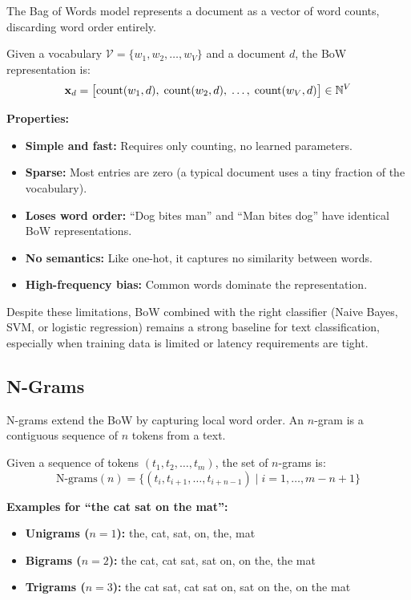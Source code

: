The Bag of Words model represents a document as a vector of word counts, discarding word
order entirely.

Given a vocabulary $\mathcal{V} = \{w_1, w_2, \ldots, w_V\}$ and a document $d$, the BoW
representation is:
\begin{equation}
    \mathbf{x}_d = \bigl[\text{count}(w_1, d), \; \text{count}(w_2, d), \; \ldots, \; \text{count}(w_V, d)\bigr] \in \mathbb{N}^V
\end{equation}

\textbf{Properties:}
\begin{itemize}
    \item \textbf{Simple and fast:} Requires only counting, no learned parameters.
    \item \textbf{Sparse:} Most entries are zero (a typical document uses a tiny fraction
    of the vocabulary).
    \item \textbf{Loses word order:} ``Dog bites man'' and ``Man bites dog'' have identical
    BoW representations.
    \item \textbf{No semantics:} Like one-hot, it captures no similarity between words.
    \item \textbf{High-frequency bias:} Common words dominate the representation.
\end{itemize}

Despite these limitations, BoW combined with the right classifier (Naive Bayes, SVM, or
logistic regression) remains a strong baseline for text classification, especially when
training data is limited or latency requirements are tight.

\subsection{N-Grams}
\label{sec:ngrams}

N-grams extend the BoW by capturing local word order. An $n$-gram is a contiguous
sequence of $n$ tokens from a text.

\begin{definition}[N-Gram]
Given a sequence of tokens $(t_1, t_2, \ldots, t_m)$, the set of $n$-grams is:
\begin{equation}
    \text{N-grams}(n) = \{(t_i, t_{i+1}, \ldots, t_{i+n-1}) \mid i = 1, \ldots, m - n + 1\}
\end{equation}
\end{definition}

\textbf{Examples for ``the cat sat on the mat'':}
\begin{itemize}
    \item \textbf{Unigrams ($n=1$):} the, cat, sat, on, the, mat
    \item \textbf{Bigrams ($n=2$):} the cat, cat sat, sat on, on the, the mat
    \item \textbf{Trigrams ($n=3$):} the cat sat, cat sat on, sat on the, on the mat
\end{itemize}

